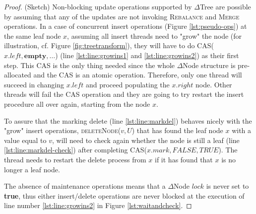 \begin{proof} (Sketch)
Non-blocking update operations supported by $\Delta$Tree are possible by
assuming that any of the updates are not invoking \textsc{Rebalance} and
\textsc{Merge} operations. 
In a case of concurrent insert operations (Figure \ref{lst:pseudo-ops}) 
at the
same leaf node $x$, assuming all insert threads need to "grow" the node 
(for illustration, cf. Figure \ref{fig:treetransform}), they
will have to do \textsc{CAS}($x.left, \textbf{empty},\ldots$) 
(line  \ref{lst:line:growins1} and \ref{lst:line:growins2}) as their
first step. This CAS is the only thing needed since the whole $\Delta$Node
structure is pre-allocated and the CAS is an atomic operation. Therefore, only
one thread will succeed in changing $x.left$ and proceed populating the
$x.right$ node. Other threads will fail the CAS operation and they are going to
try restart the insert procedure all over again, starting from the node $x$.

To assure that the marking delete (line \ref{lst:line:markdel}) behaves nicely
with the "grow" insert operations, \textsc{deleteNode}($v, U$) that has found
the leaf node $x$ with a value equal to $v$, will need to check again whether
the node is still a leaf (line \ref{lst:line:markdel-check}) after completing
\textsc{CAS}($x.mark, FALSE, TRUE$).
The thread needs to restart the delete process from $x$ if it has found that $x$
is no longer a leaf node.

The absence of maintenance operations means that a $\Delta$Node $lock$ is 
never set to \textbf{true}, thus either insert/delete operations are never blocked
at the execution of line number \ref{lst:line:growins2} in Figure \ref{lst:waitandcheck}.
\end{proof}


